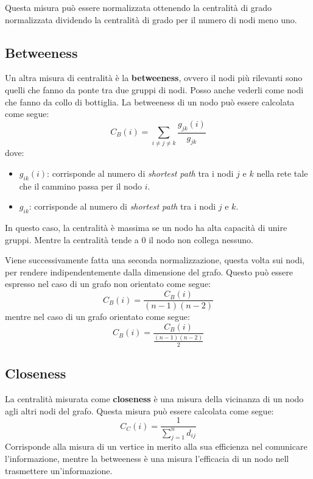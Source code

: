 Questa misura può essere normalizzata ottenendo la centralità di grado normalizzata
dividendo la centralità di grado per il numero di nodi meno uno.
\subsection{Betweeness}
Un altra misura di centralità è la \textbf{betweeness}, ovvero il nodi più
rilevanti sono quelli che fanno da ponte tra due gruppi di nodi. Posso anche
vederli come nodi che fanno da collo di bottiglia. La betweeness di un nodo
può essere calcolata come segue:
\begin{equation}
    C_B(i) = \sum_{i \neq j \neq k} \frac{g_{jk}(i)}{g_{jk}}
\end{equation}
dove:
\begin{itemize}
    \item $g_{ik}(i)$: corrisponde al numero di \textit{shortest path} tra i
          nodi $j$ e $k$ nella rete tale che il cammino passa per il nodo $i$.
    \item $g_{ik}$: corrisponde al numero di \textit{shortest path} tra i nodi
          $j$ e $k$.
\end{itemize}
In questo caso, la centralità è massima se un nodo ha alta capacità di unire
gruppi. Mentre la centralità tende a $0$ il nodo non collega nessuno.

Viene successivamente fatta una seconda normalizzazione, questa volta sui nodi,
per rendere indipendentemente dalla dimensione del grafo. Questo può essere
espresso nel caso di un grafo non orientato come segue:
\begin{equation}
    C_B(i) = \frac{C_B(i)}{(n - 1)(n - 2)}
\end{equation}
mentre nel caso di un grafo orientato come segue:
\begin{equation}
    C_B(i) = \frac{C_B(i)}{\frac{(n - 1)(n - 2)}{2}}
\end{equation}
\subsection{Closeness}
La centralità misurata come \textbf{closeness} è una misura della vicinanza di
un nodo agli altri nodi del grafo. Questa misura può essere calcolata come segue:
\begin{equation}
    C_C(i) = \frac{1}{\sum_{j=1}^{n} d_{ij}}
\end{equation}
Corrisponde alla misura di un vertice in merito alla sua efficienza nel
comunicare l'informazione, mentre la betweeness è una misura l'efficacia di un
nodo nell trasmettere un'informazione.

